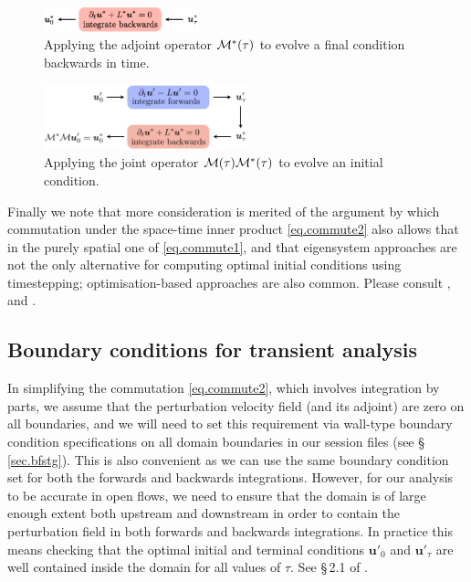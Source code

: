 \documentclass[11pt,a4paper]{report}
\newcommand\upert{{\bm{u}'}}
\newcommand\Mop{{\cal M}}
\newcommand\Madj{{\cal M^*}}
\begin{document}
\begin{figure}
\begin{center}
\includegraphics[width=0.4\textwidth]{backwards}
\end{center}
\caption{Applying the adjoint operator $\Madj(\tau)$ to evolve a final
  condition backwards in time.}
\label{fig.backwards}
\end{figure}

\begin{figure}
\begin{center}
\includegraphics[width=0.525\textwidth]{forwardsbackwards}
\end{center}
\caption{Applying the joint operator $\Mop(\tau)\Madj(\tau)$ to evolve
  an initial condition.}
\label{fig.toandfro}
\end{figure}

Finally we note that more consideration is merited of the argument by
which commutation under the space-time inner product
\eqref{eq.commute2} also allows that in the purely spatial one of
\eqref{eq.commute1}, and that eigensystem approaches are not the only
alternative for computing optimal initial conditions using
timestepping; optimisation-based approaches are also common. Please
consult \citet{schmid07}, \cite{bbs08b} and \citet{mbs13}.

\subsection{Boundary conditions for transient analysis}
\label{sec.tgbcs}

In simplifying the commutation \eqref{eq.commute2}, which involves
integration by parts, we assume that the perturbation velocity field
(and its adjoint) are zero on all boundaries, and we will need to set
this requirement via wall-type boundary condition specifications on
all domain boundaries in our session files (see
\S\,\ref{sec.bfstg}). This is also convenient as we can use the same
boundary condition set for both the forwards and backwards
integrations. However, for our analysis to be accurate in open flows,
we need to ensure that the domain is of large enough extent both
upstream and downstream in order to contain the perturbation field in
both forwards and backwards integrations.  In practice this means
checking that the optimal initial and terminal conditions $\upert_0$
and $\upert_\tau$ are well contained inside the domain for all values
of $\tau$. See \S\,2.1 of \citet{bbs08a}.
\end{document}
